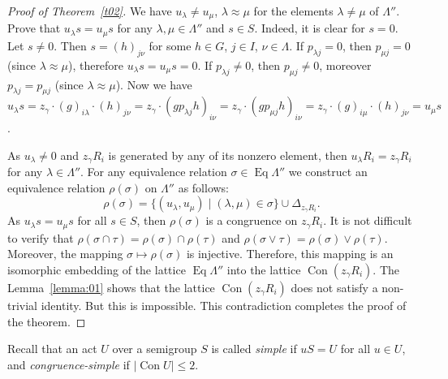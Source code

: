 \documentclass{birkau}
\numberwithin{equation}{section}
\theoremstyle{plain}
\theoremstyle{definition}
\DeclareMathOperator{\Con}{Con}
\DeclareMathOperator{\Eq}{Eq}
\begin{document}
\begin{proof}[Proof of Theorem~\ref{t02}]
        We have $u_\lambda \ne u_\mu$, $\lambda \approx \mu$ for the elements $\lambda \ne \mu$ of $\Lambda''$. Prove that $u_\lambda s=u_\mu s$ for any $\lambda, \mu \in \Lambda''$ and $s\in S$. Indeed, it is clear for $s=0$. Let $s\ne 0$. Then $s=(h)_{j\nu}$ for some $h\in G$, $j\in I$, $\nu \in \Lambda$. If $p_{\lambda j}=0$, then $p_{\mu j}=0$ (since $\lambda \approx \mu$), therefore $u_\lambda s=u_\mu s=0$. If $p_{\lambda j}\ne 0$, then $p_{\mu j} \ne 0$, moreover $p_{\lambda j}=p_{\mu j}$ (since $\lambda \approx \mu$). Now we have $u_\lambda s=z_\gamma\cdot (g)_{i\lambda} \cdot (h)_{j\nu} = z_\gamma\cdot (gp_{\lambda j}h)_{i\nu} = z_\gamma \cdot (gp_{\mu j}h)_{i\nu} = z_\gamma \cdot (g)_{i\mu} \cdot (h)_{j\nu} =u_\mu s$.

        As $u_\lambda \ne 0$ and $z_\gamma R_i$ is generated by any of its nonzero element, then $u_\lambda R_i = z_\gamma R_i$ for any $\lambda \in \Lambda''$. For any equivalence relation $\sigma \in \Eq \Lambda''$ we construct an equivalence relation $\rho(\sigma)$ on $\Lambda''$ as follows: $$ \rho(\sigma)=\{ (u_\lambda,u_\mu) \mid (\lambda,\mu)\in \sigma \} \cup \Delta_{z_\gamma R_i}.  $$ As $u_\lambda s=u_\mu s$ for all $s\in S$, then $\rho(\sigma)$ is a congruence on $z_\gamma R_i$. It is not difficult to verify that $\rho (\sigma \cap \tau) =\rho(\sigma) \cap \rho(\tau)$ and $\rho (\sigma \vee \tau) =\rho(\sigma) \vee \rho(\tau)$. Moreover, the mapping $\sigma \mapsto \rho(\sigma)$ is injective. Therefore, this mapping is an isomorphic embedding of the lattice $\Eq \Lambda''$ into the lattice $\Con (z_\gamma R_i)$.   The Lemma~\ref{lemma:01} shows that the lattice $\Con (z_\gamma R_i)$ does not satisfy a non-trivial identity. But this is impossible. This contradiction completes the proof of the theorem.
	\end{proof}
	
	Recall that an act $U$ over a semigroup $S$ is called \textit{simple} if $uS = U$ for all $ u \in U$, and \textit{congruence-simple} if $|\Con U| \leqslant 2$.
	
\end{document}
